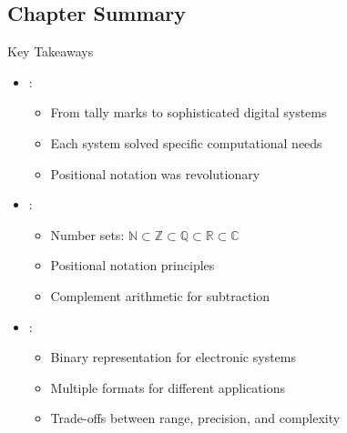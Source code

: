 \subsection{Chapter Summary}

\begin{frame}{Key Takeaways}
\begin{itemize}
\item {}:
\begin{itemize}
\item From tally marks to sophisticated digital systems
\item Each system solved specific computational needs
\item Positional notation was revolutionary
\end{itemize}
\vspace{0.3cm}
\item {}:
\begin{itemize}
\item Number sets: $\mathbb{N} \subset \mathbb{Z} \subset \mathbb{Q} \subset \mathbb{R} \subset \mathbb{C}$
\item Positional notation principles
\item Complement arithmetic for subtraction
\end{itemize}
\vspace{0.3cm}
\item {}:
\begin{itemize}
\item Binary representation for electronic systems
\item Multiple formats for different applications
\item Trade-offs between range, precision, and complexity
\end{itemize}
\end{itemize}
\end{frame}

